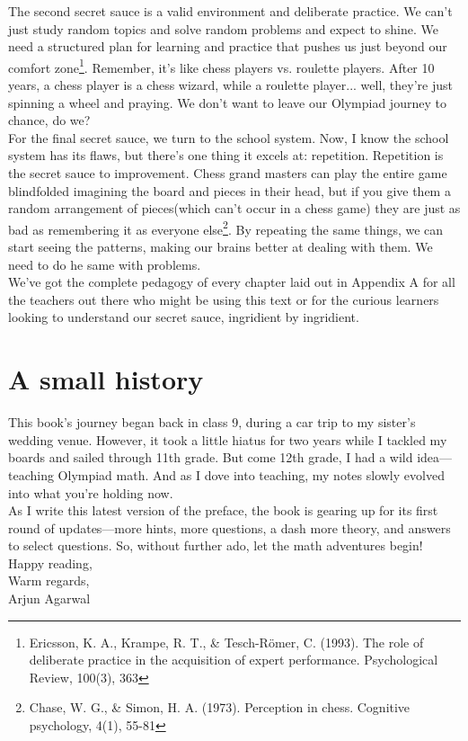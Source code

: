 The second secret sauce is a valid environment and deliberate practice. We can't just study random topics and solve random problems and expect to shine. We need a structured plan for learning and practice that pushes us just beyond our comfort zone\footnote{Ericsson, K. A., Krampe, R. T., \& Tesch-Römer, C. (1993). The role of deliberate practice in the acquisition of expert performance. Psychological Review, 100(3), 363}. Remember, it's like chess players vs. roulette players. After 10 years, a chess player is a chess wizard, while a roulette player... well, they're just spinning a wheel and praying. We don't want to leave our Olympiad journey to chance, do we?\\
For the final secret sauce, we turn to the school system. Now, I know the school system has its flaws, but there's one thing it excels at: repetition. Repetition is the secret sauce to improvement. Chess grand masters can play the entire game blindfolded imagining the board and pieces in their head, but if you give them a random arrangement of pieces(which can't occur in a chess game) they are just as bad as remembering it as everyone else\footnote{Chase, W. G., \& Simon, H. A. (1973). Perception in chess. Cognitive psychology, 4(1), 55-81}. By repeating the same things, we can start seeing the patterns, making our brains better at dealing with them. We need to do he same with problems.\\

We've got the complete pedagogy of every chapter laid out in Appendix A for all the teachers out there who might be using this text or for the curious learners looking to understand our secret sauce, ingridient by ingridient.\\

\section{A small history}
This book's journey began back in class 9, during a car trip to my sister's wedding venue. However, it took a little hiatus for two years while I tackled my boards and sailed through 11th grade. But come 12th grade, I had a wild idea—teaching Olympiad math. And as I dove into teaching, my notes slowly evolved into what you're holding now.\\
As I write this latest version of the preface, the book is gearing up for its first round of updates—more hints, more questions, a dash more theory, and answers to select questions. So, without further ado, let the math adventures begin!\\
Happy reading,\\
Warm regards,\\
Arjun Agarwal




